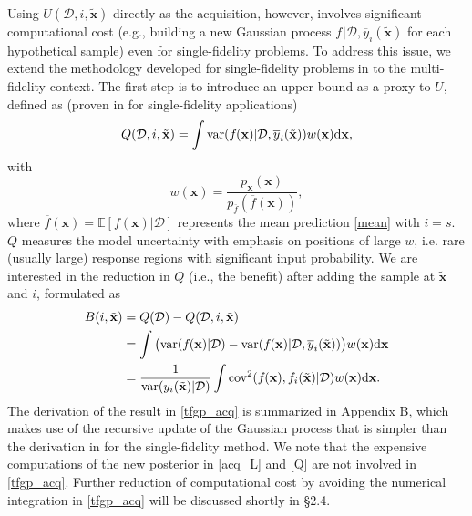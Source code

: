 \documentclass[11pt]{article}
\begin{document}
Using $U(\mathcal{D}, i, \tilde{\mathbf{x}})$ directly as the acquisition, however, involves significant computational cost (e.g., building a new Gaussian process $f_{}|\mathcal{D}, \overline{y}_i(\tilde{\mathbf{x}})$ for each hypothetical sample) even for single-fidelity problems. To address this issue, we extend the methodology developed for single-fidelity problems in \cite{sapsis2020output, blanchard2021output} to the multi-fidelity context. The first step is to introduce an upper bound as a proxy to $U$, defined as (proven in \cite{sapsis2020output} for single-fidelity applications)
\begin{equation}
    Q(\mathcal{D}, i, \tilde{\mathbf{x}}) = \int {\rm{var}}(f_{}(\mathbf{x})|\mathcal{D}, \overline{y}_i(\tilde{\mathbf{x}})) w(\mathbf{x}) \mathrm{d} \mathbf{x},
\label{Q}
\end{equation}
with
\begin{equation}
    w(\mathbf{x}) = \frac{p_{\mathbf{x}}(\mathbf{x})}{p_{\overline{f}}(\overline{f}(\mathbf{x}))},
\label{weight}
\end{equation}
where $\overline{f}(\mathbf{x}) = \mathbb{E}[f(\mathbf{x})|\mathcal{D}]$ represents the mean prediction \eqref{mean} with $i=s$. $Q$ measures the model uncertainty with emphasis on positions of large $w$, i.e. rare (usually large) response regions with significant input probability. We are interested in the reduction in $Q$ (i.e., the benefit) after adding the sample at $\tilde{\mathbf{x}}$ and $i$, formulated as 
\begin{align}
    B(i, \tilde{\mathbf{x}})  & = Q(\mathcal{D}) - Q(\mathcal{D}, i, \tilde{\mathbf{x}})
\nonumber \\
    & = \int \big({\rm{var}}(f_{}(\mathbf{x})|\mathcal{D})-{\rm{var}}(f_{}(\mathbf{x})|\mathcal{D}, \overline{y}_i(\tilde{\mathbf{x}})) \big) w(\mathbf{x}) \mathrm{d} \mathbf{x}
\nonumber \\
    & = \frac{1}{{\rm{var}}(y_i(\tilde{\mathbf{x}})|\mathcal{D})}\int {\rm{cov}}^2(f_{}(\mathbf{x}),f_i(\tilde{\mathbf{x}})|\mathcal{D}) w(\mathbf{x}) \mathrm{d} \mathbf{x}.
\label{tfgp_acq}
\end{align}
The derivation of the result in \eqref{tfgp_acq} is summarized in Appendix B, which makes use of the recursive update of the Gaussian process that is simpler than the derivation in \cite{blanchard2021output} for the single-fidelity method. We note that the expensive computations of the new posterior in \eqref{acq_L} and \eqref{Q} are not involved in \eqref{tfgp_acq}. Further reduction of computational cost by avoiding the numerical integration in \eqref{tfgp_acq} will be discussed shortly in \S2.4.
\end{document}
